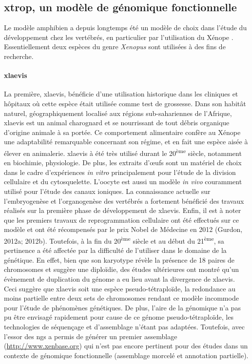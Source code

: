 \documentclass[../main.tex]{subfiles}
\begin{document}
\subsection{\gls{xtrop}, un modèle de génomique fonctionnelle}\label{subsec:xtrop-model}
Le modèle amphibien a depuis longtemps été un modèle de choix dans l'étude du développement chez les vertébrés, en particulier par l'utilisation du Xénope \citep{Harland2011}.
Essentiellement deux espèces du genre \textit{Xenopus} sont utilisées à des fins de recherche.

\paragraph{\gls{xlaevis}}
La première, \gls{xlaevis}, bénéficie d'une utilisation historique dans les cliniques et hôpitaux où cette espèce était utilisée comme test de grossesse.
Dans son habitât naturel, géographiquement localisé aux régions sub-sahariennes de l'Afrique, \gls{xlaevis} est un animal charognard et se nourrissant de tout débris organique d'origine animale à sa portée.
Ce comportement alimentaire confère au Xénope une adaptabilité remarquable concernant son régime, et en fait une espèce aisée à élever en animalerie.
\gls{xlaevis} à été très utilisé durant le 20\textsuperscript{ème} siècle, notamment en biochimie, physiologie.
De plus, les extraits d'œufs sont un matériel de choix dans le cadre d'expériences \textit{in vitro} principalement pour l'étude de la division cellulaire et du cytosquelette.
L'oocyte est aussi un modèle \textit{in vivo} couramment utilisé pour l'étude des canaux ioniques.
La connaissance actuelle sur l'embryogenèse et l'organogenèse des vertébrés a fortement bénéficié des travaux réalisés sur la première phase de développement de \gls{xlaevis}.
Enfin, il est à noter que les premiers travaux de reprogrammation cellulaire ont été effectués sur ce modèle et ont été récompensés par le prix Nobel de Médecine en 2012 (Gurdon, 2012a; 2012b).
Toutefois, à la fin du 20\textsuperscript{ème} siècle et au début du 21\textsuperscript{ème}, sa pertinence a été affectée par la difficulté de l'utiliser dans le domaine de la génétique.
En effet, bien que son karyotype révèle la présence de 18 paires de chromosomes et suggère une diploïdie, des études ultérieures ont montré qu'un évènement de duplication du génome a eu lieu avant la divergence de \gls{xlaevis}. 
Ceci suggère que \gls{xlaevis} soit une espèce pseudo-tétraploïde, la redondance au moins partielle entre deux sets de chromosomes rendant ce modèle incommode pour l'étude de phénomènes génétiques.
De plus, l'aire de la génomique n'a pas pu être envisagé rapidement pour cause de ce génome pseudo-tétraploïde, les technologies de séquençage et d'assemblage n'étant pas adaptées.
Toutefois, avec l'essor des \gls{ngs} a permis de générer un premier assemblage (\url{http://www.xenbase.org}) qui n'est pas encore pertinent pour des études dans un contexte de génomique fonctionnelle (assemblage morcelé et annotation partielle).
\end{document}
